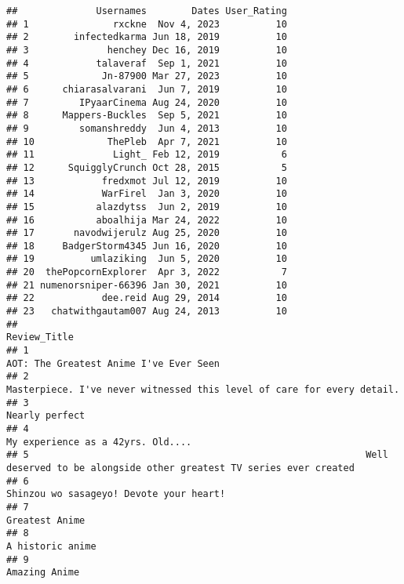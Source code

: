 \documentclass[
]{article}
\begin{document}
\begin{verbatim}
##              Usernames        Dates User_Rating
## 1               rxckne  Nov 4, 2023          10
## 2        infectedkarma Jun 18, 2019          10
## 3              henchey Dec 16, 2019          10
## 4            talaveraf  Sep 1, 2021          10
## 5             Jn-87900 Mar 27, 2023          10
## 6      chiarasalvarani  Jun 7, 2019          10
## 7         IPyaarCinema Aug 24, 2020          10
## 8      Mappers-Buckles  Sep 5, 2021          10
## 9         somanshreddy  Jun 4, 2013          10
## 10             ThePleb  Apr 7, 2021          10
## 11              Light_ Feb 12, 2019           6
## 12      SquigglyCrunch Oct 28, 2015           5
## 13            fredxmot Jul 12, 2019          10
## 14            WarFirel  Jan 3, 2020          10
## 15           alazdytss  Jun 2, 2019          10
## 16           aboalhija Mar 24, 2022          10
## 17       navodwijerulz Aug 25, 2020          10
## 18     BadgerStorm4345 Jun 16, 2020          10
## 19          umlaziking  Jun 5, 2020          10
## 20  thePopcornExplorer  Apr 3, 2022           7
## 21 numenorsniper-66396 Jan 30, 2021          10
## 22            dee.reid Aug 29, 2014          10
## 23   chatwithgautam007 Aug 24, 2013          10
##                                                                                                                     Review_Title
## 1                                                                                         AOT: The Greatest Anime I've Ever Seen
## 2                                                         Masterpiece. I've never witnessed this level of care for every detail.
## 3                                                                                                                 Nearly perfect
## 4                                                                                              My experience as a 42yrs. Old....
## 5                                                            Well deserved to be alongside other greatest TV series ever created
## 6                                                                                        Shinzou wo sasageyo! Devote your heart!
## 7                                                                                                                 Greatest Anime
## 8                                                                                                               A historic anime
## 9                                                                                                                  Amazing Anime

\end{verbatim}
\end{document}
